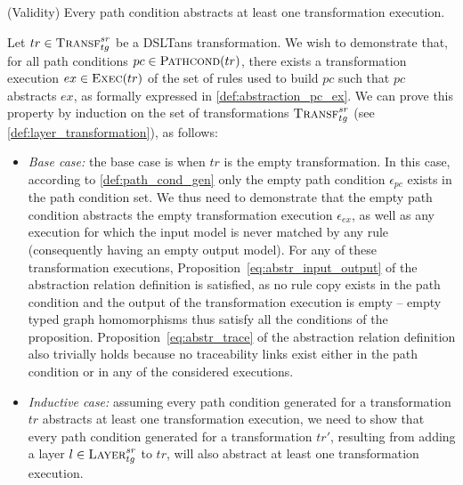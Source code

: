 \begin{proposition}{(Validity)}
\label{prop:pc_validity}
Every path condition abstracts at least one transformation execution.
\end{proposition}
\begin{ps}

Let $tr\in \textsc{Transf}^{sr}_{tg}$ be a DSLTans transformation. We wish to demonstrate that, for all path conditions $pc\in \textsc{Pathcond}(tr)$, there exists a transformation execution $ex\in \textsc{Exec}(tr)$ of the set of
rules used to build $pc$ such that $pc$ abstracts $ex$, as formally expressed in \cref{def:abstraction_pc_ex}. We can prove this property by induction on the set of transformations $\textsc{Transf}^{sr}_{tg}$ (see \cref{def:layer_transformation}), as follows:

\begin{itemize}
  \item \emph{Base case:} the base case is when $tr$ is the empty
  transformation. In this case, according to \cref{def:path_cond_gen} only the
  empty path condition $\epsilon_{pc}$ exists in the path condition set. We thus
  need to demonstrate that the empty path condition abstracts the empty
  transformation execution $\epsilon_{ex}$, as well as any execution for which
  the input model is never matched by any rule (consequently having an empty
  output model). For any of these transformation executions, Proposition~\ref{eq:abstr_input_output} of the abstraction relation definition is satisfied, as no rule copy exists in the path condition and the output of the transformation execution is empty -- empty typed graph homomorphisms thus satisfy all the conditions of the proposition. Proposition~\ref{eq:abstr_trace} of the abstraction relation definition also trivially holds because no traceability links exist either in the path condition or in any of the considered executions.
  
 
\item \emph{Inductive case:} assuming every path condition generated for a transformation $tr$ abstracts at least one transformation execution, we need to show that every path condition generated for a transformation $tr'$, resulting from adding a layer $l\in \textsc{Layer}^{sr}_{tg}$ to $tr$, will also abstract at least one transformation execution. 
\end{itemize}


\end{ps}
